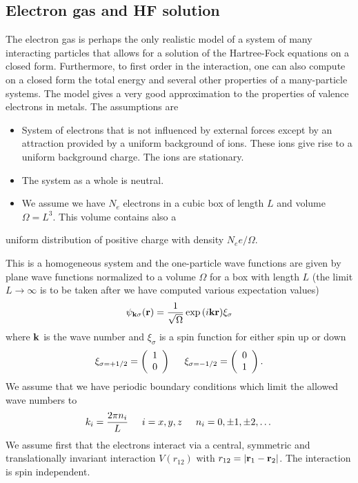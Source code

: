 \documentclass[%
twoside,                 %
final,                   %
10pt]{article}
\begin{document}
\subsection{Electron gas and HF solution}
\begin{block}{}
The electron gas is perhaps the only realistic model of a 
system of many interacting particles that allows for a solution
of the Hartree-Fock equations on a closed form. Furthermore, to first order in the interaction, one can also
compute on a closed form the total energy and several other properties of a many-particle systems. 
The model gives a very good approximation to the properties of valence electrons in metals.
The assumptions are

\begin{itemize}
 \item System of electrons that is not influenced by external forces except by an attraction provided by a uniform background of ions. These ions give rise to a uniform background charge. The ions are stationary.

 \item The system as a whole is neutral.

 \item We assume we have $N_e$ electrons in a cubic box of length $L$ and volume $\Omega=L^3$. This volume contains also a
\end{itemize}

\noindent
uniform distribution of positive charge with density $N_ee/\Omega$. 


This is a homogeneous system and the one-particle wave functions are given by plane wave functions normalized to a volume $\Omega$ 
for a box with length $L$ (the limit $L\rightarrow \infty$ is to be taken after we have computed various expectation values)
\[
\psi_{{\bf k}\sigma}({\bf r})= \frac{1}{\sqrt{\Omega}}\exp{(i{\bf kr})}\xi_{\sigma}
\]
where ${\bf k}$ is the wave number and  $\xi_{\sigma}$ is a spin function for either spin up or down
\[ 
\xi_{\sigma=+1/2}=\left(\begin{array}{c} 1 \\ 0 \end{array}\right) \hspace{0.5cm}
\xi_{\sigma=-1/2}=\left(\begin{array}{c} 0 \\ 1 \end{array}\right).
\]
We assume that we have periodic boundary conditions which limit the allowed wave numbers to
\[
k_i=\frac{2\pi n_i}{L}\hspace{0.5cm} i=x,y,z \hspace{0.5cm} n_i=0,\pm 1,\pm 2, \dots
\]
We assume first that the electrons interact via a central, symmetric and translationally invariant
interaction  $V(r_{12})$ with
$r_{12}=|{\bf r}_1-{\bf r}_2|$.  The interaction is spin independent.


\end{block}
\end{document}

